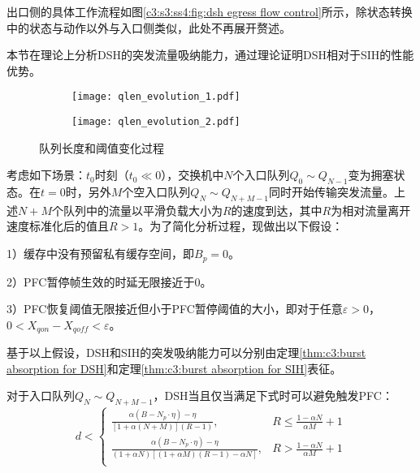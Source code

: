 出口侧的具体工作流程如图\ref{c3:s3:ss4:fig:dsh egress flow control}所示，除状态转换中的状态与动作以外与入口侧类似，此处不再展开赘述。

\label{c3:s4:dsh analysis}

本节在理论上分析DSH的突发流量吸纳能力，通过理论证明DSH相对于SIH的性能优势。

\begin{figure}[H]
  \begin{subfigure}[b]{0.49\linewidth}
      \centering
      \texttt{[image: qlen\_evolution\_1.pdf]}
      \label{c3:s4:ss2:fig:sub1:dsh qlen evaluation 1}
  \end{subfigure}
  \begin{subfigure}[b]{0.49\linewidth}
      \centering
      \texttt{[image: qlen\_evolution\_2.pdf]}
      \label{c3:s4:ss2:fig:sub2:dsh qlen evaluation 2}
  \end{subfigure}
  \caption{队列长度和阈值变化过程}
  \label{c3:s4:ss2:fig:dsh qlen evaluation}
\end{figure}


考虑如下场景\cite{TON98DT}：$t_0$时刻（$t_0 \ll 0$），交换机中$N$个入口队列$Q_0 \sim Q_{N-1}$变为拥塞状态。在$t=0$时，另外$M$个空入口队列$Q_N \sim Q_{N+M-1}$同时开始传输突发流量。上述$N+M$个队列中的流量以平滑负载大小为$R$的速度到达，其中$R$为相对流量离开速度标准化后的值且$R>1$。为了简化分析过程，现做出以下假设：

1）缓存中没有预留私有缓存空间，即$B_p=0$。

2）PFC暂停帧生效的时延无限接近于0。

3）PFC恢复阈值无限接近但小于PFC暂停阈值的大小，即对于任意$\varepsilon > 0$，$0<X_{qon} - X_{qoff}<\varepsilon$。

基于以上假设，DSH和SIH的突发吸纳能力可以分别由定理\ref{thm:c3:burst absorption for DSH}和定理\ref{thm:c3:burst absorption for SIH}表征。


\begin{theorem}
  对于入口队列$Q_N \sim Q_{N+M-1}$，DSH当且仅当满足下式时可以避免触发PFC：
  \label{thm:c3:burst absorption for DSH}
  \begin{equation}
    d < 
    \begin{cases}
      \frac{\alpha(B-N_p\cdot \eta)-\eta}{[1+\alpha(N+M)](R-1)}, & R\leqslant\frac{1-\alpha N}{\alpha M}+1 \\
      \frac{\alpha(B-N_p\cdot \eta)-\eta}{(1+\alpha N)[(1+\alpha M)(R-1)-\alpha N]}, & R>\frac{1-\alpha N}{\alpha M}+1 \\
    \end{cases}
    \label{eqn:c3:port pause threshold}
  \end{equation}
  
\end{theorem}

